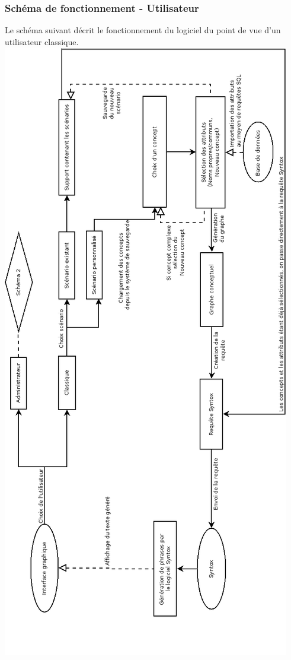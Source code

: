 \documentclass[12pt]{report}
\begin{document}
	\subsubsection{Schéma de fonctionnement - Utilisateur}
	Le schéma suivant décrit le fonctionnement du logiciel du point de vue d'un utilisateur classique.
	\includegraphics[scale=0.45]{FonctionnementUtilisateur.png}
	
\end{document}
